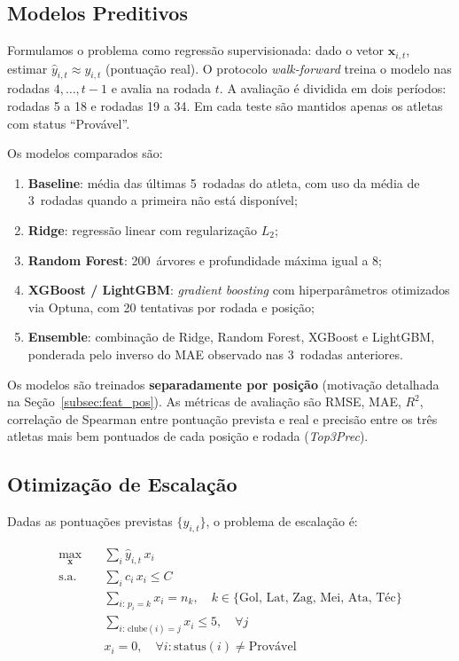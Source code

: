 \documentclass[12pt, a4paper, oneside]{article}
\begin{document}
\subsection{Modelos Preditivos}
\label{subsec:modelos}

Formulamos o problema como regressão supervisionada: dado o vetor
$\mathbf{x}_{i,t}$, estimar $\hat{y}_{i,t} \approx y_{i,t}$ (pontuação real).
O protocolo \textit{walk-forward} treina o modelo nas rodadas $4,\ldots,t-1$
e avalia na rodada $t$. A avaliação é dividida em dois períodos: rodadas 5 a 18
e rodadas 19 a 34. Em cada teste são mantidos apenas os atletas com status
``Provável''.

Os modelos comparados são:
\begin{enumerate}[leftmargin=*, label=(\roman*)]
  \item \textbf{Baseline}: média das últimas 5~rodadas do atleta, com uso da
        média de 3~rodadas quando a primeira não está disponível;
  \item \textbf{Ridge}: regressão linear com regularização $L_2$;
  \item \textbf{Random Forest}: 200~árvores e profundidade máxima igual a 8;
  \item \textbf{XGBoost / LightGBM}: \textit{gradient boosting} com
        hiperparâmetros otimizados via Optuna, com 20 tentativas por rodada e posição;
  \item \textbf{Ensemble}: combinação de Ridge, Random Forest, XGBoost e LightGBM,
        ponderada pelo inverso do MAE observado nas 3~rodadas anteriores.
\end{enumerate}

Os modelos são treinados \textbf{separadamente por posição} (motivação detalhada
na Seção~\ref{subsec:feat_pos}).
As métricas de avaliação são RMSE, MAE, $R^2$, correlação de Spearman entre
pontuação prevista e real e precisão entre os três atletas mais bem pontuados de
cada posição e rodada (\textit{Top3Prec}).

\subsection{Otimização de Escalação}
\label{subsec:otimizacao}

Dadas as pontuações previstas $\{\hat{y}_{i,t}\}$, o problema de escalação é:

\begin{align}
  \max_{\mathbf{x}} \quad
  & \sum_{i} \hat{y}_{i,t}\,x_i \label{eq:obj}\\
  \text{s.a.} \quad
  & \sum_{i} c_i\,x_i \leq C \tag{orçamento}\\
  & \sum_{i:\,p_i=k} x_i = n_k,\quad
    k \in \{\text{Gol, Lat, Zag, Mei, Ata, Téc}\} \tag{posições}\\
  & \sum_{i:\,\text{clube}(i)=j} x_i \leq 5,\quad \forall j \tag{concentração}\\
  & x_i = 0,\quad \forall i : \text{status}(i) \neq
    \text{Provável} \tag{disponib.}
\end{align}
\end{document}
